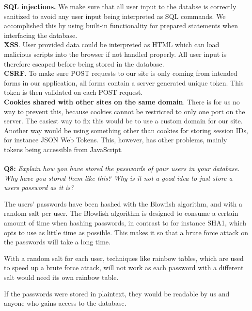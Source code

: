 \textbf{SQL injections.} We make sure that all user input to the databse is correctly sanitized to avoid any user input being interpreted as SQL commands.
We accomplished this by using built-in functionality for prepared statements when interfacing the database. \\
\textbf{XSS}. User provided data could be interpreted as HTML which can load malicious scripts into the browser if not handled properly.
All user input is therefore escaped before being stored in the database. \\
\textbf{CSRF}. To make sure POST requests to our site is only coming from intended forms in our application, all forms contain a server generated unique token.
This token is then validated on each POST request. \\
\textbf{Cookies shared with other sites on the same domain}. There is for us no way to prevent this, because cookies cannot be restricted to only one port on the server.
The easiest way to fix this would be to use a custom domain for our site.
Another way would be using something other than cookies for storing session IDs, for instance JSON Web Tokens.
This, however, has other problems, mainly tokens being accessible from JavaScript.

\paragraph{}
\textbf{Q8:}
\textit{Explain how you have stored the passwords of your users in your database. Why have you stored them like this? Why is it not a good idea to just store a users password as it is?}

The users' passwords have been hashed with the Blowfish\cite{blowfish} algorithm, and with a random salt per user.
The Blowfish algorithm is designed to consume a certain amount of time when hashing passwords, in contrast to for instance SHA1, which opts to use as little time as possible.
This makes it so that a brute force attack on the passwords will take a long time.

With a random salt for each user, techniques like rainbow tables, which are used to speed up a brute force attack, will not work as each password with a different salt would need its own rainbow table.

If the passwords were stored in plaintext, they would be readable by us and anyone who gains access to the database.
